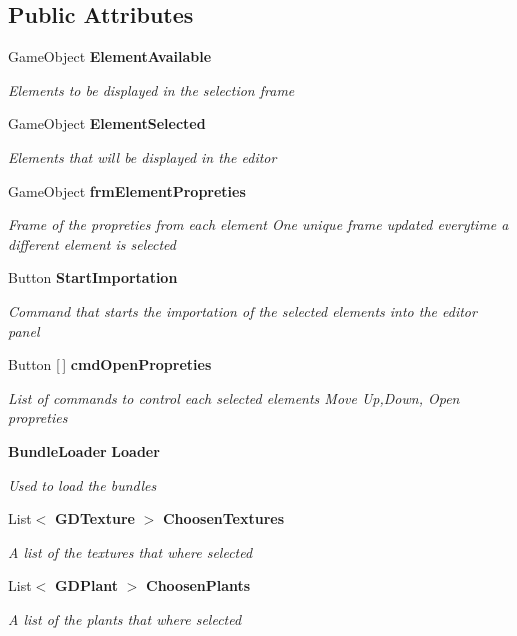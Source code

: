 \subsection*{Public Attributes}
\begin{DoxyCompactItemize}
\item 
Game\+Object \textbf{ Element\+Available}
\begin{DoxyCompactList}\small\item\em Elements to be displayed in the selection frame \end{DoxyCompactList}\item 
Game\+Object \textbf{ Element\+Selected}
\begin{DoxyCompactList}\small\item\em Elements that will be displayed in the editor \end{DoxyCompactList}\item 
Game\+Object \textbf{ frm\+Element\+Propreties}
\begin{DoxyCompactList}\small\item\em Frame of the propreties from each element One unique frame updated everytime a different element is selected \end{DoxyCompactList}\item 
Button \textbf{ Start\+Importation}
\begin{DoxyCompactList}\small\item\em Command that starts the importation of the selected elements into the editor panel \end{DoxyCompactList}\item 
Button [$\,$] \textbf{ cmd\+Open\+Propreties}
\begin{DoxyCompactList}\small\item\em List of commands to control each selected elements Move Up,Down, Open propreties \end{DoxyCompactList}\item 
\textbf{ Bundle\+Loader} \textbf{ Loader}
\begin{DoxyCompactList}\small\item\em Used to load the bundles \end{DoxyCompactList}\item 
List$<$ \textbf{ G\+D\+Texture} $>$ \textbf{ Choosen\+Textures}
\begin{DoxyCompactList}\small\item\em A list of the textures that where selected \end{DoxyCompactList}\item 
List$<$ \textbf{ G\+D\+Plant} $>$ \textbf{ Choosen\+Plants}
\begin{DoxyCompactList}\small\item\em A list of the plants that where selected \end{DoxyCompactList}\end{DoxyCompactItemize}


